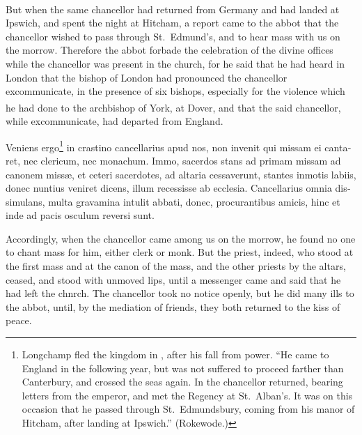 \documentclass{book}
\newcounter{engnote}
\newcommand{\engnotenum}{\textsuperscript{\arabic{engnote}\stepcounter{engnote}}}
\begin{document}
\begin{paracol}{2}
\begin{otherlanguage}{latin}
\end{otherlanguage}

\switchcolumn

But when the same chancellor had returned from Germany\engnotenum{} and had landed at Ipswich, and spent the night at Hitcham, a report came to the abbot that the chancellor wished to pass through St.\ Edmund's, and to hear mass with us on the morrow. Therefore the abbot forbade the celebration of the divine offices while the chancellor was present in the church, for he said that he had heard in London that the bishop of London had pronounced the chancellor excommunicate, in the presence of six bishops, especially for the violence which he had done to the archbishop of York,\engnotenum{} at Dover, and that the said chancellor, while excommunicate, had departed from England.

\switchcolumn*

\begin{otherlanguage}{latin}
Veniens ergo\footnote[\ddag]{Longchamp fled the kingdom in , after his fall from power. ``He came to England in the following year, but was not suffered to proceed farther than Canterbury, and crossed the seas again. In  the chancellor returned, bearing letters from the emperor, and met the Regency at St.\ Alban's. It was on this occasion that he passed through St.\ Edmundsbury, coming from his manor of Hitcham, after landing at Ipswich.'' (Rokewode.)} in crastino cancellarius apud nos, non invenit qui missam ei cantaret, nec clericum, nec monachum. Immo, sacerdos stans ad primam missam ad canonem miss\ae{}, et ceteri sacerdotes, ad altaria cessaverunt, stantes inmotis labiis, donec nuntius veniret dicens, illum recessisse ab ecclesia. Cancellarius omnia dissimulans, multa gravamina intulit abbati, donec, procurantibus amicis, hinc et inde ad pacis osculum reversi sunt.
\end{otherlanguage}

\switchcolumn

Accordingly, when the chancellor came among us on the morrow, he found no one to chant mass for him, either clerk or monk. But the priest, indeed, who stood at the first mass and at the canon of the mass, and the other priests by the altars, ceased, and stood with unmoved lips, until a messenger came and said that he had left the chnrch. The chancellor took no notice openly, but he did many ills to the abbot, until, by the mediation of friends, they both returned to the kiss of peace.


\end{paracol}
\end{document}
